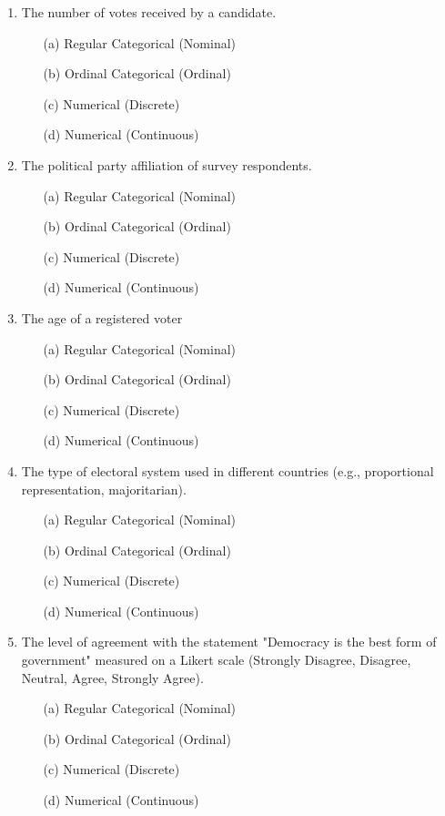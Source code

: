 \documentclass{article}
\begin{document}
\begin{enumerate}
    \item The number of votes received by a candidate.
    \begin{itemize}
        \item[(a)] Regular Categorical (Nominal)
        \item[(b)] Ordinal Categorical (Ordinal)
        \item[(c)] Numerical (Discrete)
        \item[(d)] Numerical (Continuous)
    \end{itemize}
    
    \item The political party affiliation of survey respondents.
    \begin{itemize}
        \item[(a)] Regular Categorical (Nominal)
        \item[(b)] Ordinal Categorical (Ordinal)
        \item[(c)] Numerical (Discrete)
        \item[(d)] Numerical (Continuous)
    \end{itemize}

    \item The age of a registered voter
    \begin{itemize}
        \item[(a)] Regular Categorical (Nominal)
        \item[(b)] Ordinal Categorical (Ordinal)
        \item[(c)] Numerical (Discrete)
        \item[(d)] Numerical (Continuous)
    \end{itemize}

    \item The type of electoral system used in different countries (e.g., proportional representation, majoritarian).
    \begin{itemize}
        \item[(a)] Regular Categorical (Nominal)
        \item[(b)] Ordinal Categorical (Ordinal)
        \item[(c)] Numerical (Discrete)
        \item[(d)] Numerical (Continuous)
    \end{itemize}  

    \item The level of agreement with the statement "Democracy is the best form of government" measured on a Likert scale (Strongly Disagree, Disagree, Neutral, Agree, Strongly Agree).
    \begin{itemize}
        \item[(a)] Regular Categorical (Nominal)
        \item[(b)] Ordinal Categorical (Ordinal)
        \item[(c)] Numerical (Discrete)
        \item[(d)] Numerical (Continuous)
    \end{itemize}


\end{enumerate}
\end{document}
